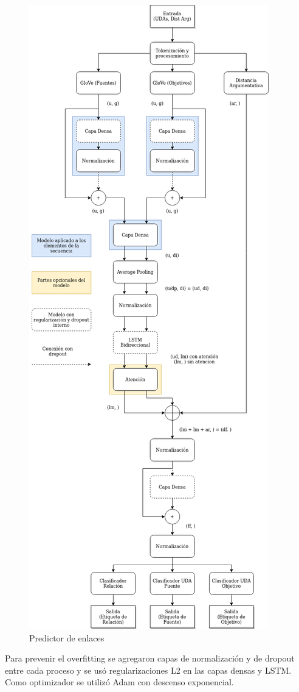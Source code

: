 \begin{figure}[h!]
	\begin{center}
		\begin{center}
			\includegraphics[scale=.3]{Graphics/Modelo Link Prediction.drawio.png}
        \end{center}
	    \caption{Predictor de enlaces}\label{fig:link_predictor}
	\end{center}
\end{figure}

Para prevenir el overfitting se agregaron capas de normalización y de dropout entre cada proceso y se usó regularizaciones
L2 en las capas densas y LSTM. Como optimizador se utilizó Adam con descenso exponencial.


